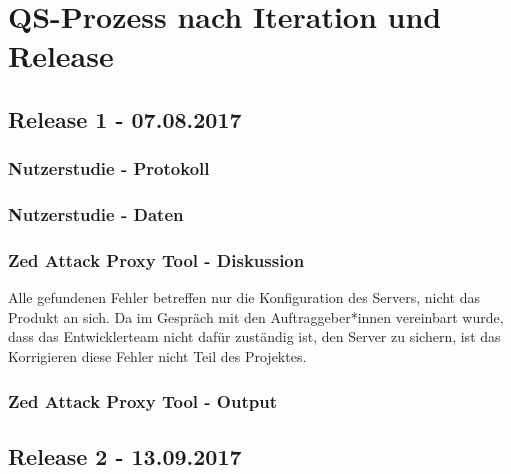 \documentclass[accentcolor=tud0b,12pt,paper=a4]{tudreport}
\begin{document}
\chapter{QS-Prozess nach Iteration und Release}














\section{Release 1 - 07.08.2017}

	\subsection*{Nutzerstudie - Protokoll}
	
	
	\subsection*{Nutzerstudie - Daten}

	\subsection*{Zed Attack Proxy Tool - Diskussion}
	Alle gefundenen Fehler betreffen nur die Konfiguration des Servers, nicht das Produkt an sich. Da im Gespräch mit den Auftraggeber*innen vereinbart wurde, dass das Entwicklerteam nicht dafür zuständig ist, den Server zu sichern, ist das Korrigieren diese Fehler nicht Teil des Projektes.

	\subsection*{Zed Attack Proxy Tool - Output}
	

\section{Release 2 - 13.09.2017}
\end{document}

